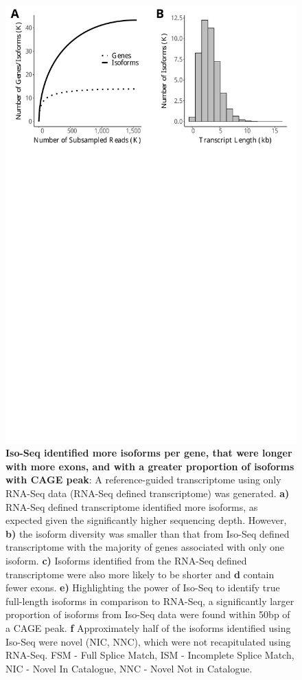 \begin{figure}[htp]
	\begin{center}
		\includegraphics[page=13,scale = 0.55]{Figures/IsoSeqWholeTranscriptome.pdf}
	\end{center}
	\captionsetup{width=0.95\textwidth}
	\caption[RNA-Seq defined transcriptome]%
	{\textbf{Iso-Seq identified more isoforms per gene, that were longer with more exons, and with a greater proportion of isoforms with CAGE peak}: A reference-guided transcriptome using only RNA-Seq data (RNA-Seq defined transcriptome) was generated. \textbf{a)} RNA-Seq defined transcriptome identified more isoforms, as expected given the significantly higher sequencing depth. However, \textbf{b)} the isoform diversity was smaller than that from Iso-Seq defined transcriptome with the majority of genes associated with only one isoform. \textbf{c)} Isoforms identified from the RNA-Seq defined transcriptome were also more likely to be shorter and \textbf{d} contain fewer exons. \textbf{e)} Highlighting the power of Iso-Seq to identify true full-length isoforms in comparison to RNA-Seq, a significantly larger proportion of isoforms from Iso-Seq data were found within 50bp of a CAGE peak. \textbf{f} Approximately half of the isoforms identified using Iso-Seq were novel (NIC, NNC), which were not recapitulated using RNA-Seq. FSM - Full Splice Match, ISM - Incomplete Splice Match, NIC - Novel In Catalogue, NNC - Novel Not in Catalogue.}   
	\label{fig:isoseq_whole_rnaseqvsisoseq}
\end{figure}


